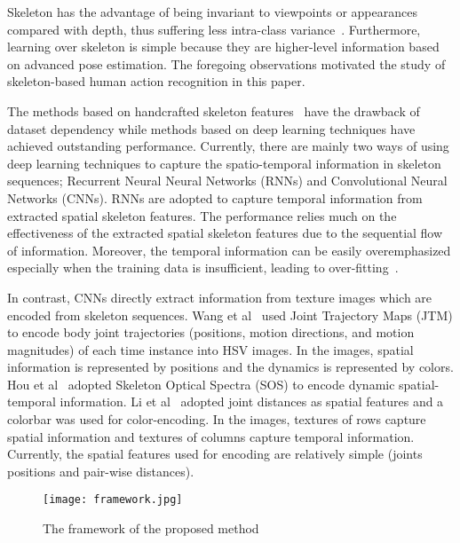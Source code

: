 \documentclass[5pt]{article}
\begin{document}
Skeleton has the advantage of being invariant to viewpoints or 
appearances compared with depth, thus suffering less intra-class 
variance~\cite{Zhang2017}. Furthermore, learning over skeleton is simple 
because they are higher-level information based on advanced pose 
estimation. The foregoing observations motivated the study of skeleton-based 
human action recognition in this paper.
	
The methods based on handcrafted skeleton 
features~\cite{xia2012view,wang2014mining,Vemulapalli2014} have the drawback of 
dataset dependency while methods based on deep learning 
techniques have achieved outstanding performance. Currently, there are mainly 
two ways of using deep learning techniques to capture the spatio-temporal 
information in skeleton sequences; Recurrent Neural Neural Networks 
(RNNs) and Convolutional Neural Networks (CNNs). RNNs are adopted to capture 
temporal information from extracted spatial skeleton features. The performance 
relies much on the effectiveness of the extracted spatial skeleton features due 
to the sequential flow of information. Moreover, the temporal information can 
be easily overemphasized especially when the training data is insufficient, 
leading to over-fitting~\cite{Wang2016}. 
	
In contrast, CNNs directly extract information from texture images which 
are encoded from skeleton sequences. Wang et al~\cite{Wang2016} used Joint 
Trajectory Maps (JTM) to encode body joint trajectories (positions, motion 
directions, and motion magnitudes) of each time instance into HSV images. In the 
images, spatial information is represented by positions and the dynamics is 
represented by colors. Hou et al~\cite{Hou2016} adopted Skeleton Optical Spectra 
(SOS) to encode dynamic spatial-temporal information. Li et al~\cite{Li2017} 
adopted joint distances as spatial features and a colorbar was used for 
color-encoding. In the images, textures of rows capture spatial information and 
textures of columns capture temporal information. Currently, the spatial 
features used for encoding are relatively simple (joints positions and 
pair-wise distances). 
	


\begin{figure*}[!t]
	\centering
	\texttt{[image: framework.jpg]}
	\caption{The framework of the proposed method}
	\label{fig:framework}
\end{figure*}
		
\end{document}
